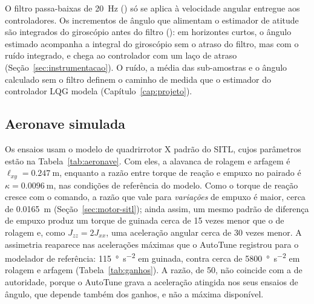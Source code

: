O filtro passa-baixas de \SI{20}{\hertz} () só se
aplica à velocidade angular entregue aos controladores. Os incrementos de
ângulo que alimentam o estimador de atitude são integrados do giroscópio
antes do filtro (): em horizontes
curtos, o ângulo estimado acompanha a integral do giroscópio sem o atraso do
filtro, mas com o ruído integrado, e chega ao controlador com um laço de
atraso (Seção~\ref{sec:instrumentacao}). O ruído, a média das sub-amostras e
o ângulo calculado sem o filtro definem o caminho de medida que o estimador do
controlador LQG modela (Capítulo~\ref{cap:projeto}).

\subsection{Aeronave simulada}

Os ensaios usam o modelo de quadrirrotor X padrão do SITL, cujos parâmetros
estão na Tabela~\ref{tab:aeronave}. Com eles, a alavanca de rolagem e arfagem
é $\ell_{xy} = \SI{0.247}{\metre}$, enquanto a razão entre torque de reação e
empuxo no pairado é $\kappa = \SI{0.0096}{\metre}$, nas condições de
referência do modelo. Como o torque de reação
cresce com o comando, a razão que vale para \emph{variações} de empuxo é
maior, cerca de \SI{0.0165}{\metre} (Seção~\ref{sec:motor-sitl}); ainda
assim, um mesmo padrão de diferença de empuxo produz um torque de guinada
cerca de 15 vezes menor que o de rolagem e, como $J_{zz} = 2J_{xx}$, uma
aceleração angular cerca de 30 vezes menor. A assimetria reaparece nas
acelerações máximas que o AutoTune registrou para o modelador de referência:
\SI{115}{\degree\per\second\squared} em guinada, contra cerca de
\SI{5800}{\degree\per\second\squared} em rolagem e arfagem
(Tabela~\ref{tab:ganhos}). A razão, de 50, não coincide com a de autoridade,
porque o AutoTune grava a aceleração atingida nos seus ensaios de ângulo, que
depende também dos ganhos, e não a máxima disponível.

